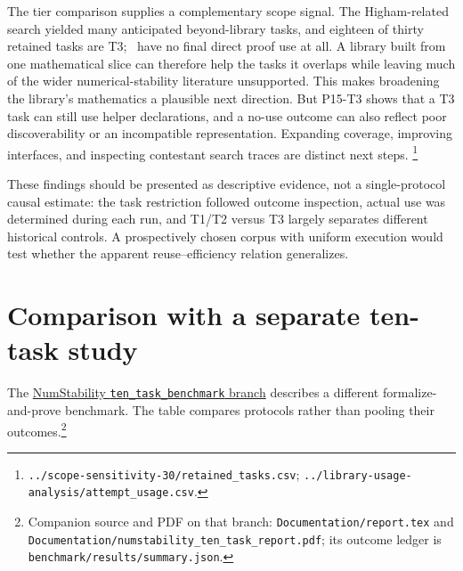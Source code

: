 \documentclass[10pt]{article}
\newcommand{\pathref}[1]{\nolinkurl{#1}}
\begin{document}
The tier comparison supplies a complementary scope signal. The
Higham-related search yielded many anticipated beyond-library tasks,
and eighteen of thirty retained tasks are T3; \DPZeroTasks\ have no final
direct proof use at all. A library built from one mathematical
slice can therefore help the tasks it overlaps while leaving much of
the wider numerical-stability literature unsupported. This makes
broadening the library's mathematics a plausible next direction.
But P15-T3 shows that a T3 task can still use helper declarations,
and a no-use outcome can also reflect poor discoverability or an
incompatible representation. Expanding coverage, improving interfaces,
and inspecting contestant search traces are distinct next steps.
\footnote{\pathref{../scope-sensitivity-30/retained_tasks.csv};
\pathref{../library-usage-analysis/attempt_usage.csv}.}

These findings should be presented as descriptive evidence, not a
single-protocol causal estimate: the task restriction followed outcome
inspection, actual use was determined during each run, and T1/T2
versus T3 largely separates different historical controls. A
prospectively chosen corpus with uniform execution would test whether
the apparent reuse--efficiency relation generalizes.

\clearpage
\section{Comparison with a separate ten-task study}
The \href{https://github.com/AlexGeorgantzas/NumStability/tree/ten_task_benchmark}{NumStability \texttt{ten\_task\_benchmark} branch} describes a different formalize-and-prove benchmark. The table compares protocols rather than pooling their outcomes.\footnote{Companion source and PDF on that branch: \pathref{Documentation/report.tex} and \pathref{Documentation/numstability_ten_task_report.pdf}; its outcome ledger is \pathref{benchmark/results/summary.json}.}
\end{document}
